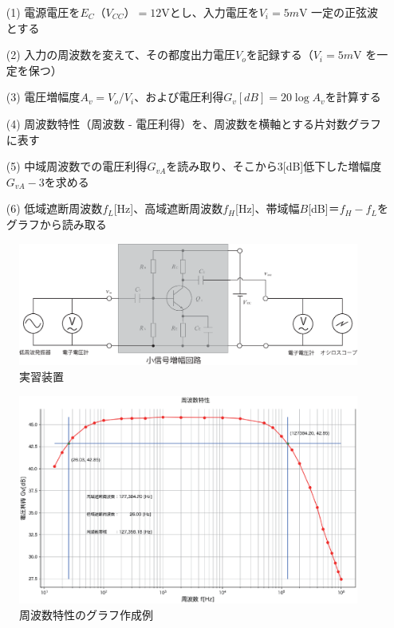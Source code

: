 \documentclass[uplatex,a4paper,11pt,oneside,openany]{jsbook}
\begin{document}
\begin{enumerate}
\item[(1)] 電源電圧を$E_C（V_{CC}）=12$Vとし、入力電圧を$V_i=5m$V 一定の正弦波とする
\item[(2)] 入力の周波数を変えて、その都度出力電圧$V_o$を記録する（$V_i=5m$V を一定を保つ）
\item[(3)] 電圧増幅度$A_v=V_o/V_i$、および電圧利得$G_v[dB]=20\log A_v$を計算する
\item[(4)] 周波数特性（周波数 - 電圧利得）を、周波数を横軸とする片対数グラフに表す
\item[(5)] 中域周波数での電圧利得$G_{vA}$を読み取り、そこから$3$[dB]低下した増幅度$G_{vA}-3$を求める
\item[(6)] 低域遮断周波数$f_L$[Hz]、高域遮断周波数$f_H$[Hz]、帯域幅$B$[dB]$＝f_H-f_L$をグラフから読み取る
\end{enumerate}

\begin{figure}[H]
  \centering
   \includegraphics[keepaspectratio, scale=0.48, angle=0]
             {figs/eps/exp0.eps}
             \caption{実習装置}
             \label{fig:exp0}
\end{figure}


\begin{figure}[H]
    \centering
     \includegraphics[keepaspectratio, scale=0.55, angle=0]
               {figs/eps/freqcharM1YExample.eps}
               \caption{周波数特性のグラフ作成例}
               \label{fig:freqcharM1Yd}
\end{figure}
\end{document}

